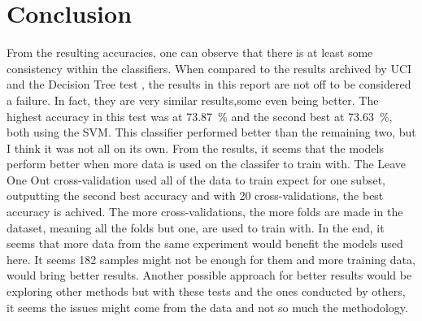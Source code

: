 \documentclass[conference,compsoc]{IEEEtran}
\begin{document}
\section{Conclusion}
From the resulting accuracies, one can observe that there is at least some consistency within the classifiers. When compared to the results archived by UCI and the Decision Tree test \cite{fuzzy}, the results in this report are not off to be considered a failure. In fact, they are very similar results,some even being better. The highest accuracy in this test was at \SI{73.87}{\percent} and the second best at \SI{73.63}{\percent}, both using the SVM. 
This classifier performed better than the remaining two, but I think it was not all on its own. From the results, it seems that the models perform better when 
more data is used on the classifer to train with. The Leave One Out cross-validation used all of the data to train expect for one subset, outputting the second 
best accuracy and with 20 cross-validations, the best accuracy is achived. The more cross-validations, the more folds are made in the dataset, meaning all the folds but one, are 
used to train with. In the end, it seems that more data from the same experiment would benefit the models used here. It seems 182 samples might not be enough for them and more training data, would bring better results. 
Another possible approach for better results would be exploring other methods but with these tests and the ones conducted by others, it seems the issues might come from the data and not so much the methodology.




\end{document}
